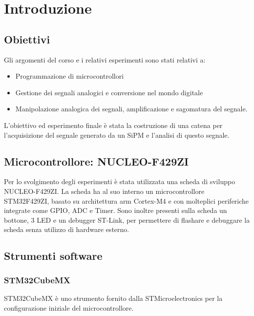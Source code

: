 \chapter*{Introduzione}

\section*{Obiettivi}
Gli argomenti del corso e i relativi esperimenti sono stati relativi a:
\begin{itemize}
    \item Programmazione di microcontrollori
    \item Gestione dei segnali analogici e conversione nel mondo digitale
    \item Manipolazione analogica dei segnali, amplificazione e sagomatura del segnale.
\end{itemize}

L'obiettivo ed esperimento finale è stata la costruzione di una catena per l'acquisizione del segnale generato da un SiPM e l'analisi di questo segnale.

\section*{Microcontrollore: NUCLEO-F429ZI}
Per lo svolgimento degli esperimenti è stata utilizzata una scheda di sviluppo NUCLEO-F429ZI.
La scheda ha al suo interno un microcontrollore STM32F429ZI, basato su architettura arm Cortex-M4 e con molteplici periferiche integrate come GPIO, ADC e Timer. Sono inoltre presenti sulla scheda un bottone, 3 LED e un debugger ST-Link, per permettere di flashare e debuggare la scheda senza utilizzo di hardware esterno.


\section*{Strumenti software}
\subsection*{STM32CubeMX}
STM32CubeMX è uno strumento fornito dalla STMicroelectronics per la configurazione iniziale del microcontrollore.

